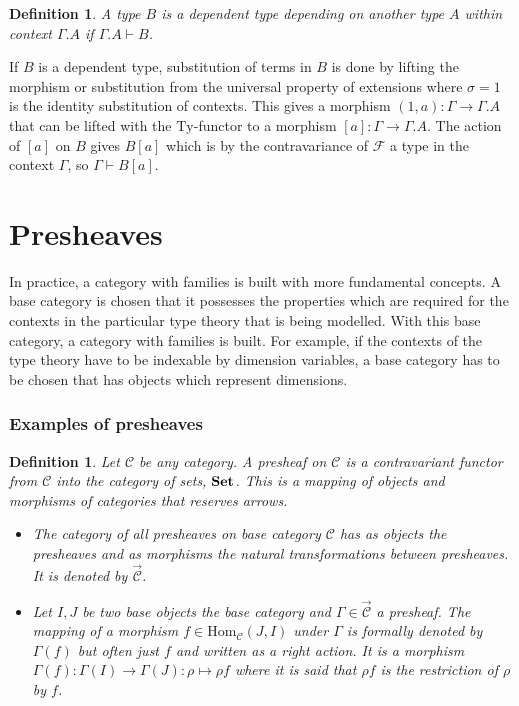 \documentclass[12pt,a4paper,twoside,xetex]{book} %
\newcommand{\keyword}[1]{\emph{#1}\index{#1}}
\newtheorem{definition}[theorem]{Definition}
\newcommand{\psh}[1]{\overrightarrow{#1}}
\begin{document}
\begin{definition}\label{depmodel}
A type $B$ is a \keyword{dependent type} depending on another type $A$ within 
context $\Gamma.A$ if $\Gamma.A \vdash B$.
\end{definition}

If $B$ is a dependent type, substitution of terms in $B$ is done by lifting the 
morphism or substitution from the universal property of extensions where 
$\sigma = 1$ is the identity substitution of contexts. This gives a morphism 
$\left(1,a\right):\Gamma\rightarrow\Gamma.A$ that can be lifted with the 
$\text{Ty}$-functor to a morphism 
$\left[a\right]:\Gamma\rightarrow\Gamma.A$. The action of $\left[a\right]$ on 
$B$ gives $B\left[a\right]$ which is by the contravariance of $\mathcal{F}$ a 
type in the context $\Gamma$, so $\Gamma\vdash B[a]$.



\section{Presheaves}

In practice, a category with families is built with more fundamental concepts. 
A base category is chosen that it possesses the properties which are required  for the contexts in the particular type theory that is being modelled. With this 
base category, a category with families is built. For example, if the 
contexts of the type theory have to be indexable by dimension variables, a base 
category has to be chosen that has objects which represent dimensions.

\subsubsection{Examples of presheaves}\label{presheafexs}

\begin{definition}
Let $\mathcal{C}$ be any category. A \keyword{presheaf} on $\mathcal{C}$ is a 
contravariant functor from $\mathcal{C}$ into the category of sets, $\text{\textbf{Set}}$. 
This is a mapping of objects and morphisms of categories that reserves arrows. 

\begin{itemize}
\item The category of all presheaves on base category $\mathcal{C}$ has as 
objects the presheaves and as morphisms the natural transformations between 
presheaves. It is denoted by $\psh{\mathcal{C}}$.

\item Let $I,J$ be two base objects the base category and $\Gamma \in 
\psh{\mathcal{C}}$ a presheaf. 
The mapping of a morphism $f \in \text{Hom}_{\mathcal{C}} (J,I)$ under $\Gamma$ 
is formally denoted by $\Gamma (f)$ but often just $f$ and written as a right 
action. 
It is a morphism $\Gamma (f) : \Gamma(I) \rightarrow \Gamma (J):\rho \mapsto 
\rho f$ where it is said that $\rho f$ is the \keyword{restriction} of $\rho$ by 
$f$.

\end{itemize}
\end{definition}
\end{document}
